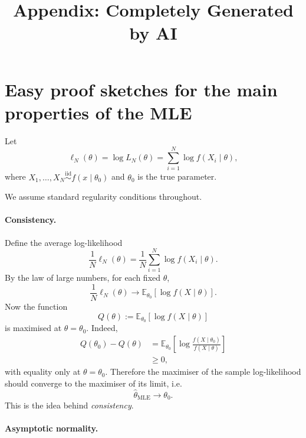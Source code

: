 \documentclass[11pt, titlepage]{article} %
\title{Appendix: Completely Generated by AI}
\date{ }
\numberwithin{equation}{section}
\theoremstyle{definition}
\numberwithin{assumption}{section}
\begin{document}
\maketitle

\section{Easy proof sketches for the main properties of the MLE}

Let
\begin{equation*}
    \ell_N(\theta)=\log L_N(\theta)=\sum_{i=1}^N \log f(X_i\mid \theta),
\end{equation*}
where $X_1,\dots,X_N \overset{\mathrm{iid}}{\sim} f(x\mid \theta_0)$ and $\theta_0$ is the true parameter.

We assume standard regularity conditions throughout.

\paragraph{Consistency.}

Define the average log-likelihood
\begin{equation*}
    \frac{1}{N}\ell_N(\theta)=\frac{1}{N}\sum_{i=1}^N \log f(X_i\mid \theta).
\end{equation*}
By the law of large numbers, for each fixed $\theta$,
\begin{equation*}
    \frac{1}{N}\ell_N(\theta)\to \mathbb{E}_{\theta_0}[\log f(X\mid \theta)].
\end{equation*}
Now the function
\begin{equation*}
    Q(\theta):=\mathbb{E}_{\theta_0}[\log f(X\mid \theta)]
\end{equation*}
is maximised at $\theta=\theta_0$. Indeed,
\begin{align*}
    Q(\theta_0)-Q(\theta)
    &= \mathbb{E}_{\theta_0}\left[\log \frac{f(X\mid \theta_0)}{f(X\mid \theta)}\right]\\
    &\ge 0,
\end{align*}
with equality only at $\theta=\theta_0$. Therefore the maximiser of the sample log-likelihood should converge to the maximiser of its limit, i.e.
\begin{equation*}
    \hat{\theta}_{\mathrm{MLE}} \to \theta_0.
\end{equation*}
This is the idea behind \textit{consistency}.

\paragraph{Asymptotic normality.}
\end{document}
